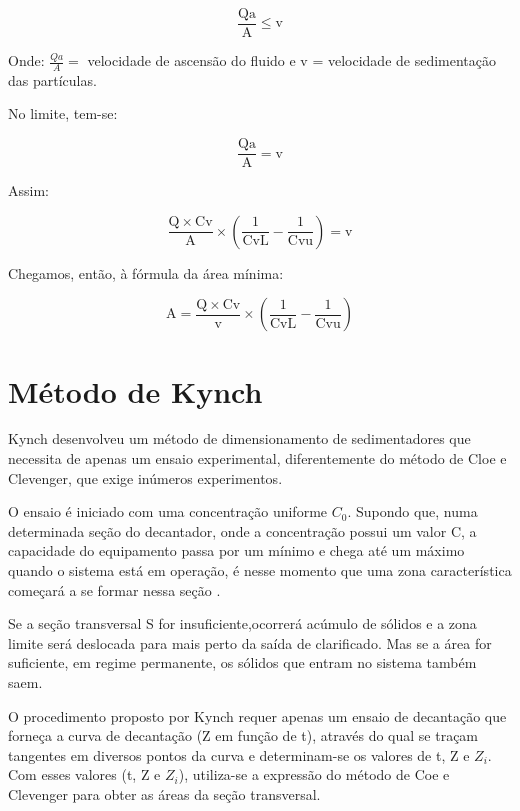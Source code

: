 \begin{equation}\label{key}
\frac{\mathrm{Qa}}{\mathrm{A}} \leq \mathrm{v}
\end{equation}

Onde: $ \frac{Qa}{A} = $ velocidade de ascensão do fluido e v = velocidade de sedimentação das partículas.

No limite, tem-se:

\begin{equation}\label{key}
\frac{\mathrm{Qa}}{\mathrm{A}}=\mathrm{v}
\end{equation}

Assim:

\begin{equation}\label{key}
\frac{\mathrm{Q} \times \mathrm{Cv}}{\mathrm{A}} \times\left(\frac{1}{\mathrm{CvL}}-\frac{1}{\mathrm{Cvu}}\right)=\mathrm{v}
\end{equation}

Chegamos, então, à fórmula da área mínima:

\begin{equation}\label{key}
\mathrm{A}=\frac{\mathrm{Q} \times \mathrm{C} \mathrm{v}}{\mathrm{v}} \times\left(\frac{\mathrm{1}}{\mathrm{C} \mathrm{v} \mathrm{L}}-\frac{\mathrm{1}}{\mathrm{C} \mathrm{v} \mathrm{u}}\right)
\end{equation}


\section{Método de Kynch}

Kynch desenvolveu um método de dimensionamento de sedimentadores que necessita de apenas um ensaio experimental, diferentemente do método de Cloe e Clevenger, que exige inúmeros experimentos. 

O ensaio é iniciado com uma concentração uniforme $ C_{0} $. Supondo que, numa determinada seção do decantador, onde a concentração possui um valor C, a capacidade do equipamento passa por um mínimo e chega até um máximo quando o sistema está em operação, é nesse momento que uma zona característica começará a se formar nessa seção \citep{foust}. 

Se a seção transversal S for insuficiente,ocorrerá acúmulo de sólidos e a zona limite será deslocada para mais perto da saída de clarificado. Mas se a área for suficiente, em regime permanente, os sólidos que entram no sistema também saem.


O procedimento proposto por Kynch requer apenas um ensaio de decantação que forneça a curva de decantação (Z em função de t), através do qual se traçam tangentes em diversos pontos da curva e determinam-se os valores de t, Z e $ Z_{i} $. Com esses valores (t, Z e $ Z_{i} $), utiliza-se a expressão do método de Coe e Clevenger para obter as áreas da seção transversal.

